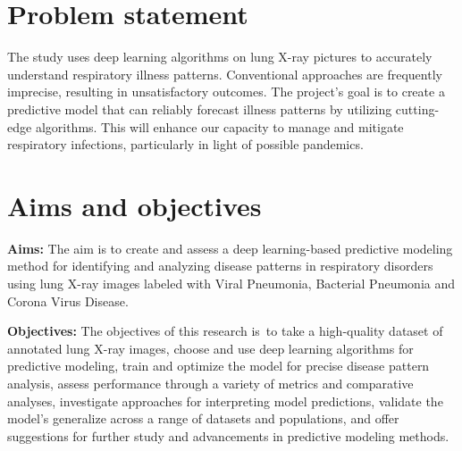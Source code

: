 \section{Problem statement}
\label{sec:intro_prob_art}
The study uses deep learning algorithms on lung X-ray pictures to accurately understand respiratory illness patterns. Conventional approaches are frequently imprecise, resulting in unsatisfactory outcomes. The project's goal is to create a predictive model that can reliably forecast illness patterns by utilizing cutting-edge algorithms. This will enhance our capacity to manage and mitigate respiratory infections, particularly in light of possible pandemics.

\section{Aims and objectives}
\label{sec:intro_aims_obj}


\textbf{Aims:} The aim is to create and assess a deep learning-based predictive modeling method for identifying and analyzing disease patterns in respiratory disorders using lung X-ray images labeled with Viral Pneumonia, Bacterial Pneumonia and Corona Virus Disease.

\textbf{Objectives:} The objectives of this research is to take a high-quality dataset of annotated lung X-ray images, choose and use deep learning algorithms for predictive modeling, train and optimize the model for precise disease pattern analysis, assess performance through a variety of metrics and comparative analyses, investigate approaches for interpreting model predictions, validate the model's generalize across a range of datasets and populations, and offer suggestions for further study and advancements in predictive modeling methods.



